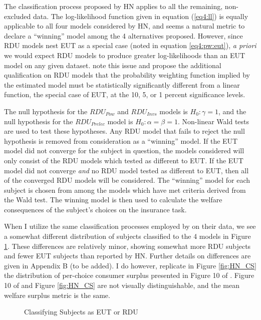 \documentclass[../main.tex]{subfiles}
\begin{document}
The classification process proposed by HN applies to all the remaining, non-excluded data.
The log-likelihood function given in equation (\ref{eq4:ll}) is equally applicable to all four models considered by HN, and seems a natural metric to declare a \enquote{winning} model among the 4 alternatives proposed.
However, since RDU models nest EUT as a special case (noted in equation \ref{eq4:pw:eut}), \textit{a priori} we would expect RDU models to produce greater log-likelihoods than an EUT model on any given dataset.
\textcite[102]{Harrison2016} note this issue and propose the additional qualification on RDU models that the probability weighting function implied by the estimated model must be statistically significantly different from a linear function, the special case of EUT, at the 10, 5, or 1 percent significance levels.

The null hypothesis for the $\mathit{RDU_{Pow}}$ and $\mathit{RDU_{Invs}}$ models is $H_0: \gamma = 1$, and the null hypothesis for the $\mathit{RDU_{Prelec}}$ model is $H_0: \alpha = \beta = 1$.
Non-linear Wald tests are used to test these hypotheses.
Any RDU model that fails to reject the null hypothesis is removed from consideration as a \enquote{winning} model.
If the EUT model did not converge for the subject in question, the models considered will only consist of the RDU models which tested as different to EUT.
If the EUT model did not converge \textit{and} no RDU model tested as different to EUT, then all of the converged RDU models will be considered.
The \enquote{winning} model for each subject is chosen from among the models which have met criteria derived from the Wald test.
The winning model is then used to calculate the welfare consequences of the subject's choices on the insurance task.

When I utilize the same classification processes employed by \textcite{Harrison2016} on their data, we see a somewhat different distribution of subjects classified to the 4 models in Figure \ref{fig:HN_pvals}.
These differences are relatively minor, showing somewhat more RDU subjects and fewer EUT subjects than reported by HN.
Further details on differences are given in Appendix B (to be added).
I do however, replicate in Figure \ref{fig:HN_CS} the distribution of per-choice consumer surplus presented in Figure 10 of \textcite[108]{Harrison2016}.
Figure 10 of \textcite{Harrison2016} and Figure \ref{fig:HN_CS} are not visually distinguishable, and the mean welfare surplus metric is the same.

\begin{figure}[h!]
	\center
	\caption{Classifying Subjects as EUT or RDU}
	\label{fig:HN_pvals}
\end{figure}
\end{document}
